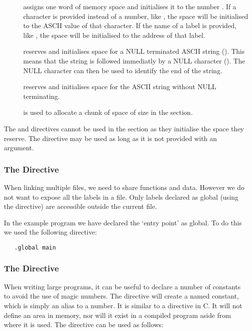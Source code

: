\begin{description}

\item[\word {}] assigns one word of memory space and initialises it to
the number .
If a character is provided instead of a number, like , the space
will be initialised to the ASCII value of that character.
If the name of a label is provided, like , the space will be
initialised to the address of that label.

\item[\asciiz {}] reserves and initialises space 
for a NULL terminated ASCII string ().
This means that the string is followed immediatly by a NULL
character (). The NULL character can then be used
to identify the end of the string.

\item[\ascii {}] reserves and initialises space for 
the ASCII string  without NULL terminating.

\item[\Space {}] is used to allocate a chunk of space 
of size  in the \bss section.

\end{description}
The \ascii and \asciiz directives cannot be used in the \bss section
as they initialise the space they reserve. The \word directive may be
used as long as it is not provided with an argument.

\subsubsection{The \Global Directive}
When linking multiple files, we need to share functions and data.
However we do not want to expose all the labels in a file.
Only labels declared as global (using the \Global directive) are
accessible outside the current file.

In the example program we have declared the `entry point'  as 
global. To do this we used the following directive:
\begin{verbatim}
   .global main
\end{verbatim}

\subsubsection{The \equ Directive}
When writing large programs, it can be useful to declare a number of
constants to avoid the use of magic numbers. The \equ directive will
create a named constant, which is simply an alias to a number. It is
similar to a  directive in C. It will not define an
area in memory, nor will it exist in a compiled program aside from
where it is used. The directive can be used as follows:

